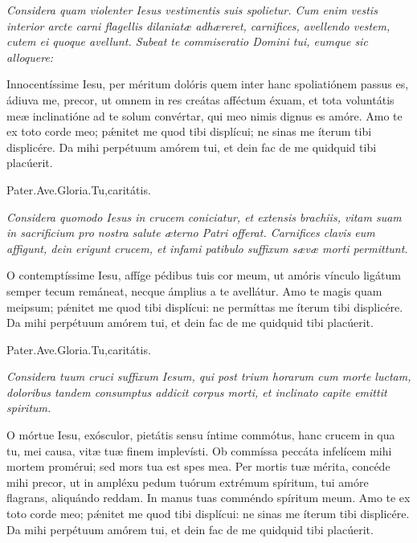 \documentclass[12pt,a6paper]{book}
\newcommand{\V}{\textbf{V.} }
\newcommand{\R}{\textbf{R.} }
\newcommand{\officiumtitle}[1]{\subsection*{\parbox{\linewidth}{\centering\textbf{\textit{#1}}}}}
\newcommand{\centeredtext}[1]{\parbox{\linewidth}{\centering\textit{#1}}}
\begin{document}
\begin{sloppy}
\textit{Considera quam violenter Iesus vestimentis suis spolietur. Cum enim vestis interior arcte carni flagellis dilaniatæ adhæreret, carnifices, avellendo vestem, cutem ei quoque avellunt. Subeat te commiseratio Domini tui, eumque sic alloquere:}

Innocentíssime Iesu, per méritum dolóris quem inter hanc spoliatiónem passus es, ádiuva me, precor, ut omnem in res creátas afféctum éxuam, et tota voluntátis meæ inclinatióne ad te solum convértar, qui meo nimis dignus es amóre. Amo te ex toto corde meo; pǽnitet me quod tibi displícui; ne sinas me íterum tibi displicére. Da mihi perpétuum amórem tui, et dein fac de me quidquid tibi placúerit.

Pater.Ave.Gloria.Tu,caritátis.


\textit{Considera quomodo Iesus in crucem coniciatur, et extensis brachiis, vitam suam in sacrificium pro nostra salute æterno Patri offerat. Carnifices clavis eum affigunt, dein erigunt crucem, et infami patibulo suffixum sævæ morti permittunt.}

O contemptíssime Iesu, affíge pédibus tuis cor meum, ut amóris vínculo ligátum semper tecum remáneat, necque ámplius a te avellátur. Amo te magis quam meipsum; pǽnitet me quod tibi displícui: ne permíttas me íterum tibi displicére. Da mihi perpétuum amórem tui, et dein fac de me quidquid tibi placúerit.

Pater.Ave.Gloria.Tu,caritátis.


\textit{Considera tuum cruci suffixum Iesum, qui post trium horarum cum morte luctam, doloribus tandem consumptus addicit corpus morti, et inclinato capite emittit spiritum.}

O mórtue Iesu, exósculor, pietátis sensu íntime commótus, hanc crucem in qua tu, mei causa, vitæ tuæ finem implevísti. Ob commíssa peccáta infelícem mihi mortem promérui; sed mors tua est spes mea. Per mortis tuæ mérita, concéde mihi precor, ut in ampléxu pedum tuórum extrémum spíritum, tui amóre flagrans, aliquándo reddam. In manus tuas comméndo spíritum meum. Amo te ex toto corde meo; pǽnitet me quod tibi displícui: ne sinas me íterum tibi displicére. Da mihi perpétuum amórem tui, et dein fac de me quidquid tibi placúerit.


\end{sloppy}
\end{document}
